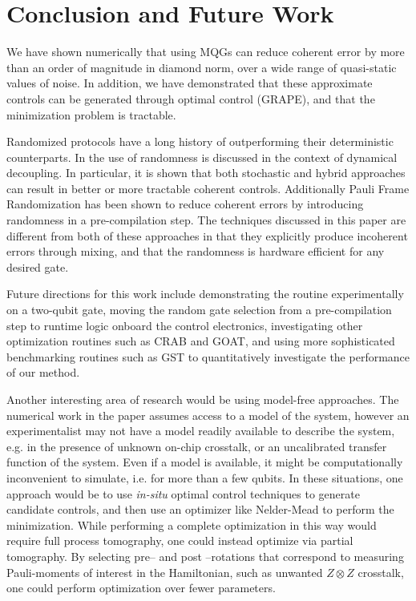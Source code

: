 \documentclass[aps,nofootinbib,pra,notitlepage,twocolumn]{revtex4-1}
\begin{document}


\section{Conclusion and Future Work}
We have shown numerically that using MQGs can reduce coherent error by more than an order of magnitude in diamond norm, over a wide range of quasi-static values of noise. In addition, we have demonstrated that these approximate controls can be generated through optimal control (GRAPE), and that the minimization problem is tractable.

Randomized protocols have a long history of outperforming their deterministic counterparts. In \cite{Viola2005, Santos2006} the use of randomness is discussed in the context of dynamical decoupling. In particular, it is shown that both stochastic and hybrid approaches can result in better or more tractable coherent controls. Additionally Pauli Frame Randomization\cite{Wallman2016} has been shown \cite{1803.01818} to reduce coherent errors by introducing randomness in a pre-compilation step. The techniques discussed in this paper are different from both of these approaches in that they explicitly produce incoherent errors through mixing, and that the randomness is hardware efficient for any desired gate.

Future directions for this work include demonstrating the routine experimentally on a two-qubit gate, moving the random gate selection from a pre-compilation step to runtime logic onboard the control electronics, investigating other optimization routines such as CRAB \cite{Caneva2011} and GOAT\cite{Machnes2018}, and using more sophisticated benchmarking routines such as GST\cite{BlumeKohout2017} to quantitatively investigate the performance of our method.

Another interesting area of research would be using model-free approaches. The numerical work in the paper assumes access to a model of the system, however an experimentalist may not have a model readily available to describe the system, e.g. in the presence of unknown on-chip crosstalk, or an uncalibrated transfer function of the system. Even if a model is available, it might be computationally inconvenient to simulate, i.e. for more than a few qubits. In these situations, one approach would be to use \textit{in-situ} optimal control techniques \cite{Wu2018, Kelly2014, Ferrie2015} to generate candidate controls, and then use an optimizer like Nelder-Mead to perform the minimization. While performing a complete optimization in this way would require full process tomography, one could instead optimize via partial tomography. By selecting pre-- and post --rotations that correspond to measuring Pauli-moments of interest in the Hamiltonian, such as unwanted $Z\otimes Z$ crosstalk, one could perform optimization over fewer parameters.
\end{document}
